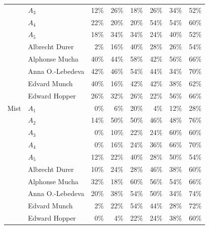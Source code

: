 \documentclass{article}
\begin{document}
\begin{table}[h]
\begin{subtable}{\textwidth}
{\begin{tabular}{llrrrrrr}
     & $A_3$ & 12\% &             26\% & 18\% &     26\% &            34\% &      52\% \\
     & $A_4$ & 22\% &             20\% & 20\% &     54\% &            54\% &      60\% \\
     & $A_5$ & 18\% &             34\% & 34\% &     24\% &            40\% &      52\% \\
     & Albrecht Durer &  2\% &             16\% & 40\% &     28\% &            26\% &      54\% \\
     & Alphonse Mucha & 40\% &             44\% & 58\% &     42\% &            56\% &      66\% \\
     & Anna O.-Lebedeva & 42\% &             46\% & 54\% &     44\% &            34\% &      70\% \\
     & Edvard Munch & 40\% &             16\% & 42\% &     42\% &            38\% &      62\% \\
     & Edward Hopper & 26\% &             32\% & 26\% &     22\% &            56\% &      66\% \\ \midrule
Mist & $A_1$ &  0\% &              6\% & 20\% &      4\% &            12\% &      28\% \\
     & $A_2$ & 14\% &             50\% & 50\% &     46\% &            48\% &      76\% \\
     & $A_3$ &  0\% &             10\% & 22\% &     24\% &            60\% &      60\% \\
     & $A_4$ &  0\% &             16\% & 24\% &     36\% &            66\% &      70\% \\
     & $A_5$ & 12\% &             22\% & 40\% &     28\% &            50\% &      54\% \\
     & Albrecht Durer & 10\% &             24\% & 28\% &     46\% &            38\% &      60\% \\
     & Alphonse Mucha & 32\% &             18\% & 60\% &     56\% &            54\% &      66\% \\
     & Anna O.-Lebedeva & 20\% &             38\% & 54\% &     50\% &            34\% &      74\% \\
     & Edvard Munch &  2\% &             22\% & 54\% &     44\% &            28\% &      72\% \\
     & Edward Hopper &  0\% &              4\% & 22\% &     24\% &            38\% &      60\% \\
\bottomrule
\end{tabular}}




\end{subtable}
\end{table}
\end{document}
